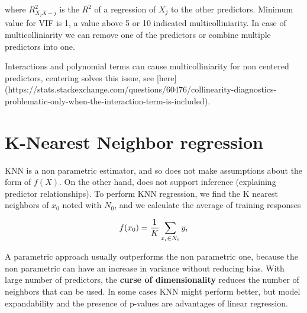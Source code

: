 where \(R_{X_jX-j}^2\) is the \(R^2\) of a regression of \(X_j\) to the other predictors. Minimum value for VIF is 1, a value above 5 or 10 indicated multicolliniarity.
In case of multicolliniarity we can remove one of the predictors or combine multiple predictors into one.

Interactions and polynomial terms can cause multicolliniarity for non centered predictors, centering solves this issue, see [here](https://stats.stackexchange.com/questions/60476/collinearity-diagnostics-problematic-only-when-the-interaction-term-is-included).

\section{K-Nearest Neighbor regression}

KNN is a non parametric estimator, and so does not make assumptions about the form of \(f(X)\). On the other hand, does not support inference (explaining predictor relationships). To perform KNN regression, we find the K nearest neighbors of \(x_0\) noted with \(N_0\), and we calculate the average of training responses

\[f(x_0) = {1 \over K} \sum_{x_i \in N_0}y_i\]

A parametric approach usually outperforms the non parametric one, because the non parametric can have an increase in variance without reducing bias. With large number of predictors, the \textbf{curse of dimensionality} reduces the number of neighbors that can be used. In some cases KNN might perform better, but model expandability and the presence of p-values are advantages of linear regression.
